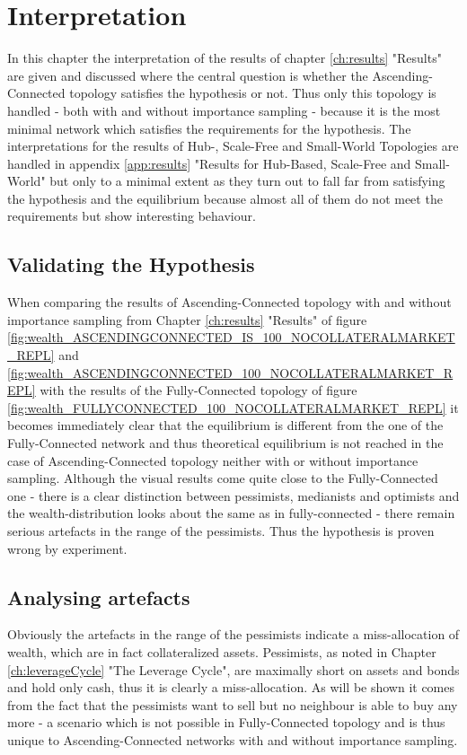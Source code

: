 \documentclass[Bachelorarbeit.tex]{subfiles}
\begin{document}
\graphicspath{{./figures/interpretation/}}	%

\chapter{Interpretation}
\label{ch:interpretation}

In this chapter the interpretation of the results of chapter \ref{ch:results} "Results" are given and discussed where the central question is whether the Ascending-Connected topology satisfies the hypothesis or not. Thus only this topology is handled - both with and without importance sampling - because it is the most minimal network which satisfies the requirements for the hypothesis. The interpretations for the results of Hub-, Scale-Free and Small-World Topologies are handled in appendix \ref{app:results} "Results for Hub-Based, Scale-Free and Small-World" but only to a minimal extent as they turn out to fall far from satisfying the hypothesis and the equilibrium because almost all of them do not meet the requirements but show interesting behaviour.

\section{Validating the Hypothesis}
When comparing the results of Ascending-Connected topology with and without importance sampling from Chapter \ref{ch:results} "Results" of figure \ref{fig:wealth_ASCENDINGCONNECTED_IS_100_NOCOLLATERALMARKET_REPL} and \ref{fig:wealth_ASCENDINGCONNECTED_100_NOCOLLATERALMARKET_REPL} with the results of the Fully-Connected topology of figure \ref{fig:wealth_FULLYCONNECTED_100_NOCOLLATERALMARKET_REPL} it becomes immediately clear that the equilibrium is different from the one of the Fully-Connected network and thus theoretical equilibrium is not reached in the case of Ascending-Connected topology neither with or without importance sampling. Although the visual results come quite close to the Fully-Connected one - there is a clear distinction between pessimists, medianists and optimists and the wealth-distribution looks about the same as in fully-connected - there remain serious artefacts in the range of the pessimists. Thus the hypothesis is proven wrong by experiment.

\section{Analysing artefacts}
Obviously the artefacts in the range of the pessimists indicate a miss-allocation of wealth, which are in fact collateralized assets. Pessimists, as noted in Chapter \ref{ch:leverageCycle} "The Leverage Cycle", are maximally short on assets and bonds and hold only cash, thus it is clearly a miss-allocation. As will be shown it comes from the fact that the pessimists want to sell but no neighbour is able to buy any more - a scenario which is not possible in Fully-Connected topology and is thus unique to Ascending-Connected networks with and without importance sampling.
\end{document}

